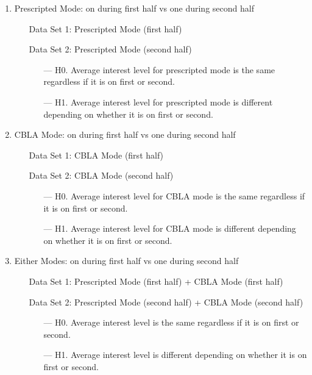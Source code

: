 \begin{enumerate}
	\item Prescripted Mode: on during first half vs one during second half
		\begin{itemize}[align=left]
			\item[Data Set 1: ] Prescripted Mode (first half)
			\item[Data Set 2: ] Prescripted Mode (second half)
			\begin{itemize}
				\item[--- H0.] Average interest level for prescripted mode is the same regardless if it is on first or second.
				\item[--- H1.] Average interest level for prescripted mode is different depending on whether it is on first or second.
			\end{itemize}
		\end{itemize}
	\item CBLA Mode: on during first half vs one during second half
		\begin{itemize}[align=left]
			\item[Data Set 1: ] CBLA Mode (first half)
			\item[Data Set 2: ] CBLA Mode (second half)
			\begin{itemize}
				\item[--- H0.] Average interest level for CBLA mode is the same regardless if it is on first or second.
				\item[--- H1.] Average interest level for CBLA mode is different depending on whether it is on first or second.			
			\end{itemize}
		\end{itemize}
	\item Either Modes: on during first half vs one during second half
		\begin{itemize}[align=left]
			\item[Data Set 1: ] Prescripted Mode (first half) + CBLA Mode (first half)
			\item[Data Set 2: ] Prescripted Mode (second half) + CBLA Mode (second half)
			\begin{itemize}
				\item[--- H0.] Average interest level is the same regardless if it is on first or second.
				\item[--- H1.] Average interest level is different depending on whether it is on first or second.
			\end{itemize}
		\end{itemize}

\end{enumerate}
